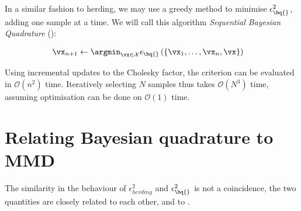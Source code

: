 In a similar fashion to herding, we may use a greedy method to minimise $\epsilon^{2}_{\bq{}}$, adding one sample at a time. We will call this algorithm \emph{Sequential Bayesian Quadrature} (\sbq{}):

\begin{align}
\vx_{n+1} &\leftarrow \argmin_{\vx \in \mathcal{X}} \epsilon_{\bq{}}\left(\{\vx_1,\ldots,\vx_{n},\vx\}\right) \label{eqn:sequential_BQ}
\end{align}

Using incremental updates to the Cholesky factor, the criterion can be evaluated in $\mathcal{O}(n^2)$ time. Iteratively selecting $N$ samples thus takes $\mathcal{O}(N^3)$ time, assuming optimisation can be done on $\mathcal{O}(1)$ time.

\section{Relating Bayesian quadrature to MMD}

The similarity in the behaviour of $\epsilon^{2}_{herding}$ and $\epsilon^{2}_{\bq{}}$ is not a coincidence, the two quantities are closely related to each other, and to \mmd.

